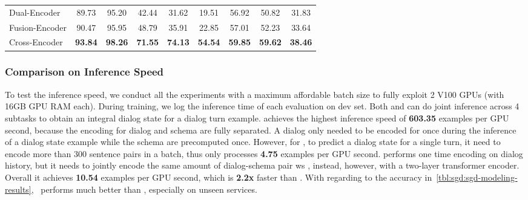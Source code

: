 \begin{table}[!tbp]
\begin{center}
{\begin{tabular}{l|ccccc|ccc}
  Dual-Encoder                 & 89.73                      & 95.20       & 42.44                          & 31.62       & 19.51       & 56.92       & 50.82       & 31.83       \\
  Fusion-Encoder               & 90.47                      & 95.95       & 48.79                          & 35.91       & 22.85       & 57.01       & 52.23       & 33.64       \\
  Cross-Encoder                & {\bf 93.84}                & {\bf 98.26} & {\bf 71.55}                    & {\bf 74.13} & {\bf 54.54} & {\bf 59.85} & {\bf 59.62} & {\bf 38.46} \\ \hline
  \bottomrule
\end{tabular}}
\end{center}
\end{table}

\subsubsection{Comparison on Inference Speed}
\label{sssec:sgd:infer-speed}
To test the inference speed, we conduct all the experiments with a
maximum affordable batch size to fully exploit 2 V100 GPUs (with 16GB
GPU RAM each). During training, we log the inference time of each
evaluation on dev set. Both \DE and \FE can do joint inference across
4 subtasks to obtain an integral dialog state for a dialog turn
example. \DE achieves the highest inference speed of {\bf 603.35}
examples per GPU second, because the encoding for dialog and schema
are fully separated. A dialog only needed to be encoded for once
during the inference of a dialog state example while the schema are
precomputed once. However, for \CE, to predict a dialog state for a
single turn, it need to encode more than 300 sentence pairs in a
batch, thus only processes {\bf 4.75} examples per GPU second. \FE
performs one time encoding on dialog history, but it needs to jointly
encode the same amount of dialog-schema pair ws \CE, instead, however,
with a two-layer transformer encoder. Overall it achieves {\bf 10.54}
examples per GPU second, which is {\bf 2.2x} faster than \CE. With
regarding to the accuracy in~\autoref{tbl:sgd:sgd-modeling-results},
\FE~performs much better than \DE, especially on unseen services.

